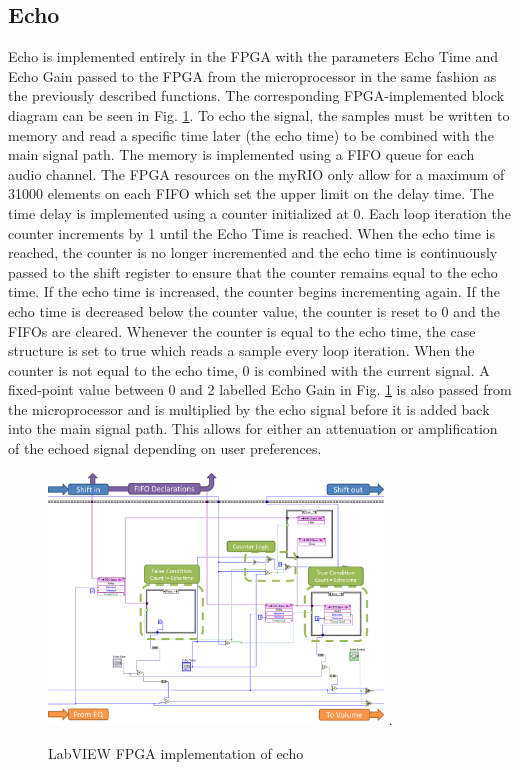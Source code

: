 \subsection{Echo}
Echo is implemented entirely in the FPGA with the parameters Echo Time and Echo Gain passed to the FPGA from the microprocessor in the same fashion as the previously described functions. 
The corresponding FPGA-implemented block diagram can be seen in Fig. \ref{fig_echo}.
To echo the signal, the samples must be written to memory and read a specific time later (the echo time) to be combined with the main signal path. 
The memory is implemented using a FIFO queue for each audio channel. The FPGA resources on the myRIO only allow for a maximum of 31000 elements on each FIFO which set the upper limit on the delay time. 
The time delay is implemented using a counter initialized at 0. Each loop iteration the counter increments by 1 until the Echo Time is reached. 
When the echo time is reached, the counter is no longer incremented and the echo time is continuously passed to the shift register to ensure that the counter remains equal to the echo time.
If the echo time is increased, the counter begins incrementing again. If the echo time is decreased below the counter value, the counter is reset to 0 and the FIFOs are cleared. 
Whenever the counter is equal to the echo time, the case structure is set to true which reads a sample every loop iteration. 
When the counter is not equal to the echo time, 0 is combined with the current signal. 
A fixed-point value between 0 and 2 labelled Echo Gain in Fig. \ref{fig_echo} is also passed from the microprocessor and is multiplied by the echo signal before it is added back into the main signal path. 
This allows for either an attenuation or amplification of the echoed signal depending on user preferences.  

\begin{figure}[!t]
\centering
\includegraphics[width=3.5in]{echo.png}
\DeclareGraphicsExtensions.
\caption{LabVIEW FPGA implementation of echo}
\label{fig_echo}
\end{figure} 

